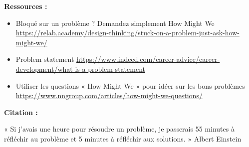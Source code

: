 \textbf{Ressources :}

\begin{itemize}
\item Bloqué sur un problème ? Demandez simplement How Might We \url{https://relab.academy/design-thinking/stuck-on-a-problem-just-ask-how-might-we/}
\item Problem statement \url{https://www.indeed.com/career-advice/career-development/what-is-a-problem-statement}
\item Utiliser les questions « How Might We » pour idéer sur les bons problèmes \url{https://www.nngroup.com/articles/how-might-we-questions/}
\end{itemize}

\textbf{Citation :}

« Si j'avais une heure pour résoudre un problème, je passerais 55 minutes à réfléchir au problème et 5 minutes à réfléchir aux solutions. » Albert Einstein

